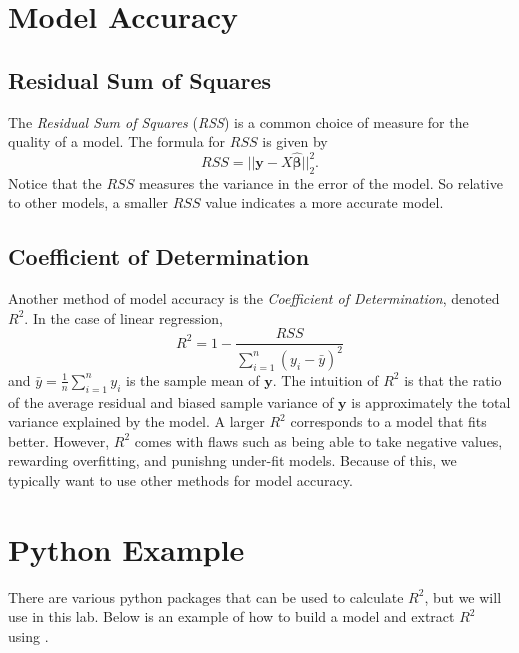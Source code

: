 %

\section*{Model Accuracy}

\subsection*{Residual Sum of Squares}
The \textit{Residual Sum of Squares} (\textit{RSS}) is a common choice of measure for the quality of a model. 
The formula for $RSS$ is given by \[ RSS = \vert\vert \boldsymbol y - X\widehat{\boldsymbol\beta} \vert\vert _2^2. \]
Notice that the $RSS$ measures the variance in the error of the model. So relative to other models, a smaller $RSS$ value indicates a more accurate model. 

\subsection*{Coefficient of Determination}
Another method of model accuracy is the \textit{Coefficient of Determination}, denoted $R^2$. In the case of linear regression, 
\[ R^2 =1 - \frac{RSS}{\sum_{i=1}^n(y_i - \bar{y})^2} \] 
and $\bar{y}= \frac{1}{n}\sum_{i=1}^n y_i$ is the sample mean of $\boldsymbol y$.
The intuition of $R^2$ is that the ratio of the average residual and biased sample variance of $\boldsymbol y$ is approximately the total variance explained by the model. 
A larger $R^2$ corresponds to a model that fits better. However, $R^2$ comes with flaws such as being able to take negative values, rewarding overfitting, and punishng under-fit models.
Because of this, we typically want to use other methods for model accuracy. 

\section*{Python Example}
There are various python packages that can be used to calculate $R^2$, but we will use  in this lab. 
Below is an example of how to build a model and extract $R^2$ using .

